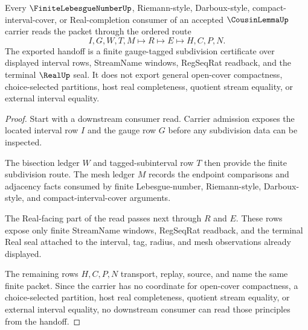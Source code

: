 \begin{theorem}
\label{thm:cousin-lemma-finite-lebesgue-handoff}
Every $\FiniteLebesgueNumberUp$, Riemann-style, Darboux-style, compact-interval-cover, or Real-completion consumer of an accepted $\CousinLemmaUp$ carrier reads the packet through the ordered route
$$
I,G,W,T,M \longmapsto R \longmapsto E \longmapsto H,C,P,N .
$$
The exported handoff is a finite gauge-tagged subdivision certificate over displayed interval rows, StreamName windows, RegSeqRat readback, and the terminal $\RealUp$ seal. It does not export general open-cover compactness, choice-selected partitions, host real completeness, quotient stream equality, or external interval equality.
\end{theorem}
\begin{proof}
Start with a downstream consumer read. Carrier admission exposes the located interval row $I$ and the gauge row $G$ before any subdivision data can be inspected.

The bisection ledger $W$ and tagged-subinterval row $T$ then provide the finite subdivision route. The mesh ledger $M$ records the endpoint comparisons and adjacency facts consumed by finite Lebesgue-number, Riemann-style, Darboux-style, and compact-interval-cover arguments.

The Real-facing part of the read passes next through $R$ and $E$. These rows expose only finite StreamName windows, RegSeqRat readback, and the terminal Real seal attached to the interval, tag, radius, and mesh observations already displayed.

The remaining rows $H,C,P,N$ transport, replay, source, and name the same finite packet. Since the carrier has no coordinate for open-cover compactness, a choice-selected partition, host real completeness, quotient stream equality, or external interval equality, no downstream consumer can read those principles from the handoff.
\end{proof}



